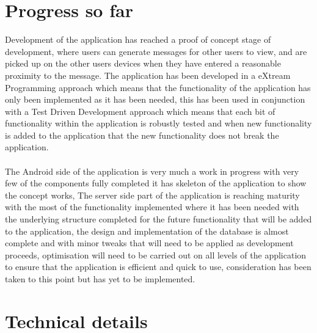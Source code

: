 \documentclass[a0,landscape]{a0poster}
\begin{document}
\begin{multicols}{4}
\section{Progress so far}

Development of the application has reached a proof of concept stage of development, where users can generate messages for other users to view, and are picked up on the other users devices when they have entered a reasonable proximity to the message. The application has been developed in a eXtream Programming approach which means that the functionality of the application has only been implemented as it has been needed, this has been used in conjunction with a Test Driven Development approach which means that each bit of functionality within the application is robustly tested and when new functionality is added to the application that the new functionality does not break the application.\\
\\
The Android side of the application is very much a work in progress with very few of the components fully completed it has skeleton of the application to show the concept works, The server side part of the application is reaching maturity with the most of the functionality implemented where it has been needed with the underlying structure completed for the future functionality that will be added to the application, the design and implementation of the database is almost complete and with minor tweaks that will need to be applied as development proceeds, optimisation will need to be carried out on all levels of the application to ensure that the application is efficient and quick to use, consideration has been taken to this point but has yet to be implemented.

\section{Technical details}


\end{multicols}
\end{document}
